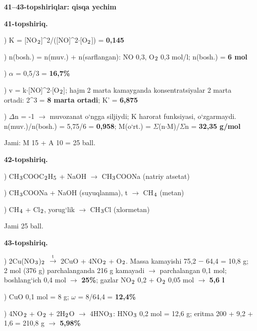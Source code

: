 \documentclass[11pt,a4paper]{article}
\renewcommand{\textsubscript}[1]{\ensuremath{_{\text{\fontsize{8}{8}\selectfont #1}}}}
\begin{document}
\noindent\textbf{41--43-topshiriqlar: qisqa yechim}\par\smallskip
\noindent\textbf{41-topshiriq.}\par
{}) K = [NO\textsubscript{2}]\textasciicircum{}2/([NO]\textasciicircum{}2$\cdot$[O\textsubscript{2}]) = \textbf{0,145}\par
{}) n(bosh.) = n(muv.) + n(sarflangan): NO 0,3, O\textsubscript{2} 0,3 mol/l; n(bosh.) = \textbf{6 mol}\par
{}) $\alpha$ = 0,5/3 = \textbf{16,7\%}\par
{}) v = k$\cdot$[NO]\textasciicircum{}2$\cdot$[O\textsubscript{2}]; hajm 2 marta kamayganda konsentratsiyalar 2 marta ortadi: 2\textasciicircum{}3 = \textbf{8 marta ortadi}; K' = \textbf{6,875}\par
{}) $\Delta$n = -1 $\to$ muvozanat o`ngga siljiydi; K harorat funksiyasi, o`zgarmaydi. n(muv.)/n(bosh.) = 5,75/6 = \textbf{0,958}; M(o`rt.) = $\Sigma$(n$\cdot$M)/$\Sigma$n = \textbf{32,35 g/mol}\par
\noindent Jami: M 15 + A 10 = 25 ball.\par
\noindent\textbf{42-topshiriq.}\par
{}) CH\textsubscript{3}COOC\textsubscript{2}H\textsubscript{5} + NaOH $\to$ CH\textsubscript{3}COONa (natriy atsetat)\par
{}) CH\textsubscript{3}COONa + NaOH (suyuqlanma), t\textdegree{} $\to$ CH\textsubscript{4} (metan)\par
{}) CH\textsubscript{4} + Cl\textsubscript{2}, yorug`lik $\to$ CH\textsubscript{3}Cl (xlormetan)\par
\noindent Jami 25 ball.\par
\noindent\textbf{43-topshiriq.}\par
{}) 2Cu(NO\textsubscript{3})\textsubscript{2} $\xrightarrow{\text{t}}$ 2CuO + 4NO\textsubscript{2} + O\textsubscript{2}. Massa kamayishi 75,2 $-$ 64,4 = 10,8 g; 2 mol (376 g) parchalanganda 216 g kamayadi $\to$ parchalangan 0,1 mol; boshlang`ich 0,4 mol $\to$ \textbf{25\%}; gazlar NO\textsubscript{2} 0,2 + O\textsubscript{2} 0,05 mol $\to$ \textbf{5,6 l}\par
{}) CuO 0,1 mol = 8 g; $\omega$ = 8/64,4 = \textbf{12,4\%}\par
{}) 4NO\textsubscript{2} + O\textsubscript{2} + 2H\textsubscript{2}O $\to$ 4HNO\textsubscript{3}: HNO\textsubscript{3} 0,2 mol = 12,6 g; eritma 200 + 9,2 + 1,6 = 210,8 g $\to$ \textbf{5,98\%}\par
\end{document}
